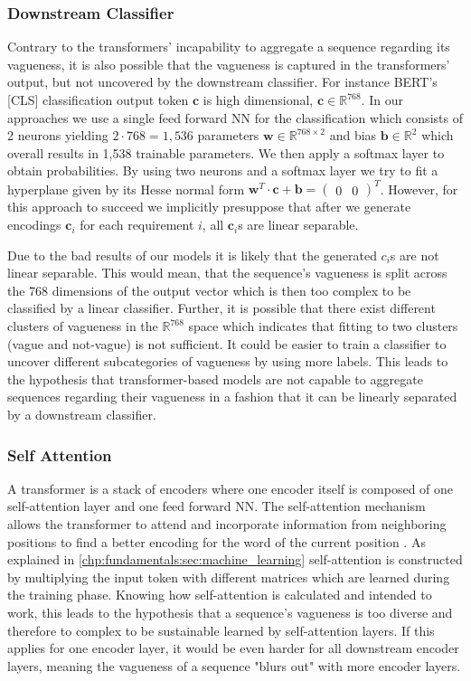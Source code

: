 \subsubsection{Downstream Classifier}
\label{chp:study:sec:interpretation:subsec:causes:downstream_classifier}
Contrary to the transformers' incapability to aggregate a sequence regarding its vagueness, it is also possible that the vagueness is captured in the transformers' output, but not uncovered by the downstream classifier.
For instance \ac{BERT}'s [CLS] classification output token $\bm{c}$ is high dimensional, $\bm{c} \in \mathbb{R}^{768}$.
In our approaches we use a single feed forward \ac{NN} for the classification which consists of 2 neurons yielding $2 \cdot 768 = 1,536$ parameters $\bm{w} \in \mathbb{R}^{768 \times 2}$ and bias $\bm{b} \in \mathbb{R}^2$ which overall results in 1,538 trainable parameters.
We then apply a softmax layer to obtain probabilities.
By using two neurons and a softmax layer we try to fit a hyperplane given by its Hesse normal form $ \bm{w}^T \cdot \bm{c} + \bm{b} = \begin{pmatrix} 0 & 0 \end{pmatrix}^T$.
However, for this approach to succeed we implicitly presuppose that after we generate encodings $\bm{c}_i$ for each requirement $i$, all $\bm{c}_i$s are linear separable.

Due to the bad results of our models it is likely that the generated $c_i$s are not linear separable.
This would mean, that the sequence's vagueness is split across the 768 dimensions of the output vector which is then too complex to be classified by a linear classifier.
Further, it is possible that there exist different clusters of vagueness in the $\mathbb{R}^{768}$ space which indicates that fitting to two clusters (vague and not-vague) is not sufficient.
It could be easier to train a classifier to uncover different subcategories of vagueness by using more labels.
This leads to the hypothesis that transformer-based models are not capable to aggregate sequences regarding their vagueness in a fashion that it can be linearly separated by a downstream classifier.

\subsubsection{Self Attention}
\label{chp:study:sec:interpretation:subsec:causes:self_attention}
A transformer is a stack of encoders where one encoder itself is composed of one self-attention layer and one feed forward \ac{NN}.
The self-attention mechanism allows the transformer to attend and incorporate information from neighboring positions to find a better encoding for the word of the current position \parencite{Vaswani:2017}.
As explained in \cref{chp:fundamentals:sec:machine_learning} self-attention is constructed by multiplying the input token with different matrices which are learned during the training phase.
Knowing how self-attention is calculated and intended to work, this leads to the hypothesis that a sequence's vagueness is too diverse and therefore to complex to be sustainable learned by self-attention layers.
If this applies for one encoder layer, it would be even harder for all downstream encoder layers, meaning the vagueness of a sequence "blurs out" with more encoder layers.
